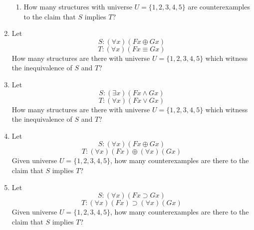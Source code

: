 \begin{mdframed}[linewidth=1]
\begin{enumerate}
\begin{enumerate}
        \item How many structures with universe $U = \{1, 2, 3, 4, 5\}$ are counterexamples to the claim that $S$ implies $T$?
    \end{enumerate}

    \item Let 
    \[
        S: (\forall x)(Fx \oplus Gx)
    \]
    \[
        T: (\forall x)(Fx \equiv Gx)
    \]
    How many structures are there with universe $U = \{1, 2, 3, 4, 5\}$ which witness the inequivalence of $S$ and $T$?

    \item Let 
    \[
        S: (\exists x)(Fx \land Gx)
    \]
    \[
        T: (\forall x)(Fx \vee Gx)
    \]
    How many structures are there with universe $U = \{1, 2, 3, 4, 5\}$ which witness the inequivalence of $S$ and $T$?

    \item  Let 
\[
    S: (\forall x)(Fx \oplus Gx)
\]
\[
    T: (\forall x)(Fx) \oplus (\forall x)(Gx)
\]
Given universe $U = \{1, 2, 3, 4, 5\}$, how many counterexamples are there to the claim that $S$ implies $T$?

\item Let 
\[
    S: (\forall x)(Fx \supset Gx)
\]
\[
    T: (\forall x)(Fx) \supset (\forall x)(Gx)
\]
Given universe $U = \{1, 2, 3, 4, 5\}$, how many counterexamples are there to the claim that $S$ implies $T$?
\end{enumerate}
\end{mdframed}

